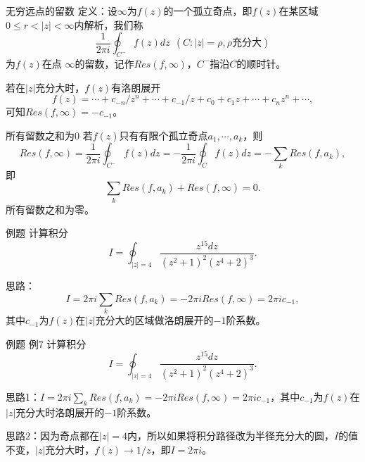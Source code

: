 \documentclass[11pt]{beamer}
\newcommand{\kong}[1][0.5]{\vspace{#1cm}}
\begin{document}
\begin{frame}{无穷远点的留数}
定义：设$\infty$为$f(z)$的一个孤立奇点，即$f(z)$在某区域$0\leq r < |z| < \infty$内解析，我们称
\begin{equation}
\frac{1}{2\pi i} \oint_{C^-} f(z) dz ~~ (C:|z|=\rho, \rho \text{充分大})
\end{equation}
为$f(z)$在点 $\infty$的留数，记作$Res(f, \infty)$，$C^-$指沿$C$的顺时针。

若在$|z|$充分大时，$f(z)$有洛朗展开
\begin{equation}
f(z) = \cdots + c_{-n}/z^n + \cdots + c_{-1}/z + c_0 + c_1 z + \cdots + c_n z^n + \cdots,
\end{equation}
可知$ Res(f,\infty) = - c_{-1}$。
\end{frame}

\begin{frame}{所有留数之和为0}
若$f(z)$只有有限个孤立奇点$a_1, \cdots, a_k$，则
\begin{equation}
Res(f,\infty) = \frac{1}{2\pi i} \oint_{C^-} f(z) dz
= - \frac{1}{2\pi i} \oint_{C} f(z) dz
= - \sum_k Res(f,a_k),
\end{equation}
即
\begin{equation}
\sum_k Res(f, a_k) + Res(f, \infty) = 0.
\end{equation}
所有留数之和为零。
\end{frame}

\begin{frame}{例题}
计算积分
\begin{equation}
I = \oint_{|z|=4} \frac{z^{15} dz}{ (z^2+1)^2 (z^4+2)^3 }.
\end{equation}

\kong[1]
思路：
\begin{equation}
I = 2 \pi i \sum_k Res(f,a_k) = - 2 \pi i Res(f, \infty) = 2\pi i c_{-1},
\end{equation}
其中$c_{-1}$为$f(z)$在$|z|$充分大的区域做洛朗展开的$-1$阶系数。 

\end{frame}

\begin{frame}{例题}
例7 计算积分
\begin{equation}
I = \oint_{|z|=4} \frac{z^{15}dz}{(z^2+1)^2 (z^4+2)^3}.
\end{equation}

\kong[1]
思路1：$I= 2 \pi i \sum_k Res(f, a_k) = - 2\pi i Res(f,\infty) = 2 \pi i c_{-1}$，其中$c_{-1}$为$f(z)$在$|z|$充分大时洛朗展开的$-1$阶系数。

\kong[1]
思路2：因为奇点都在$|z|=4$内，所以如果将积分路径改为半径充分大的圆，$I$的值不变，$|z|$充分大时，$f(z) \rightarrow 1/z$，即$I = 2\pi i $。
\end{frame}
\end{document}
